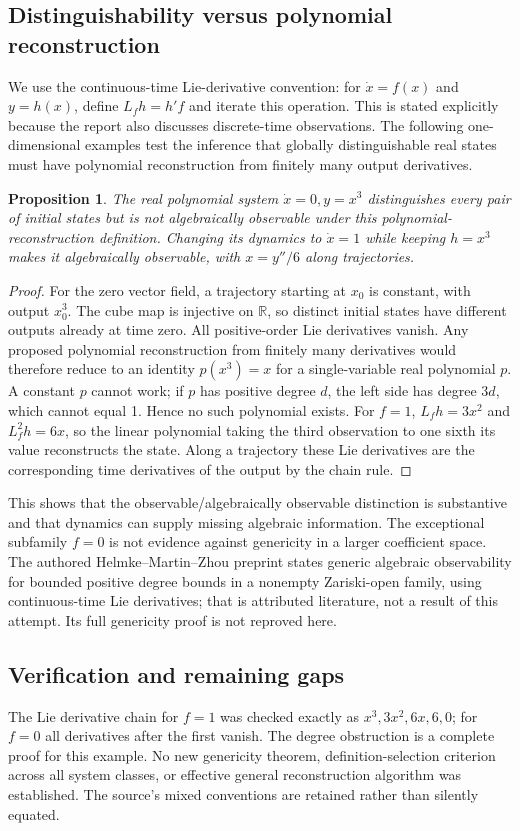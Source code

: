 \documentclass[11pt]{article}
\newtheorem{proposition}{Proposition}
\begin{document}
\subsection{Distinguishability versus polynomial reconstruction}
We use the continuous-time Lie-derivative convention: for $\dot x=f(x)$ and $y=h(x)$, define $L_fh=h'f$ and iterate this operation. This is stated explicitly because the report also discusses discrete-time observations. The following one-dimensional examples test the inference that globally distinguishable real states must have polynomial reconstruction from finitely many output derivatives.
\begin{proposition}
The real polynomial system $\dot x=0,y=x^3$ distinguishes every pair of initial states but is not algebraically observable under this polynomial-reconstruction definition. Changing its dynamics to $\dot x=1$ while keeping $h=x^3$ makes it algebraically observable, with $x=y''/6$ along trajectories.
\end{proposition}
\begin{proof}
For the zero vector field, a trajectory starting at $x_0$ is constant, with output $x_0^3$. The cube map is injective on $\mathbb R$, so distinct initial states have different outputs already at time zero. All positive-order Lie derivatives vanish. Any proposed polynomial reconstruction from finitely many derivatives would therefore reduce to an identity $p(x^3)=x$ for a single-variable real polynomial $p$. A constant $p$ cannot work; if $p$ has positive degree $d$, the left side has degree $3d$, which cannot equal 1. Hence no such polynomial exists.
For $f=1$, $L_fh=3x^2$ and $L_f^2h=6x$, so the linear polynomial taking the third observation to one sixth its value reconstructs the state. Along a trajectory these Lie derivatives are the corresponding time derivatives of the output by the chain rule.
\end{proof}
This shows that the observable/algebraically observable distinction is substantive and that dynamics can supply missing algebraic information. The exceptional subfamily $f=0$ is not evidence against genericity in a larger coefficient space. The authored Helmke--Martin--Zhou preprint states generic algebraic observability for bounded positive degree bounds in a nonempty Zariski-open family, using continuous-time Lie derivatives; that is attributed literature, not a result of this attempt. Its full genericity proof is not reproved here.
\subsection{Verification and remaining gaps}
The Lie derivative chain for $f=1$ was checked exactly as $x^3,3x^2,6x,6,0$; for $f=0$ all derivatives after the first vanish. The degree obstruction is a complete proof for this example. No new genericity theorem, definition-selection criterion across all system classes, or effective general reconstruction algorithm was established. The source's mixed conventions are retained rather than silently equated.
\end{document}
